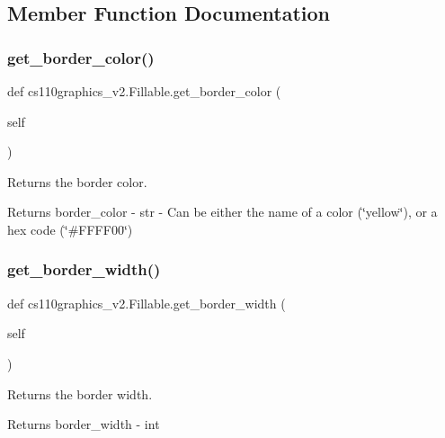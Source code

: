 \subsection{Member Function Documentation}
\mbox{\label{classcs110graphics__v2_1_1Fillable_a7814c409d4cdf9c6c006bb12a64c9e90}} 
\subsubsection{\texorpdfstring{get\_border\_color()}{get\_border\_color()}}
{\footnotesize\ttfamily def cs110graphics\+\_\+v2.\+Fillable.\+get\+\_\+border\+\_\+color (\begin{DoxyParamCaption}\item[{}]{self }\end{DoxyParamCaption})}



Returns the border color. 

\begin{DoxyReturn}{Returns}
border\+\_\+color -\/ str -\/ Can be either the name of a color (\char`\"{}yellow\char`\"{}), or a hex code (\char`\"{}\#\+F\+F\+F\+F00\char`\"{}) 
\end{DoxyReturn}
\mbox{\label{classcs110graphics__v2_1_1Fillable_a7e9e8b8996fba870bf9bc4eacd5be6aa}} 
\subsubsection{\texorpdfstring{get\_border\_width()}{get\_border\_width()}}
{\footnotesize\ttfamily def cs110graphics\+\_\+v2.\+Fillable.\+get\+\_\+border\+\_\+width (\begin{DoxyParamCaption}\item[{}]{self }\end{DoxyParamCaption})}



Returns the border width. 

\begin{DoxyReturn}{Returns}
border\+\_\+width -\/ int 
\end{DoxyReturn}
\mbox{\label{classcs110graphics__v2_1_1Fillable_abc6f79dd754321c041f4befeb37e21f0}} 
